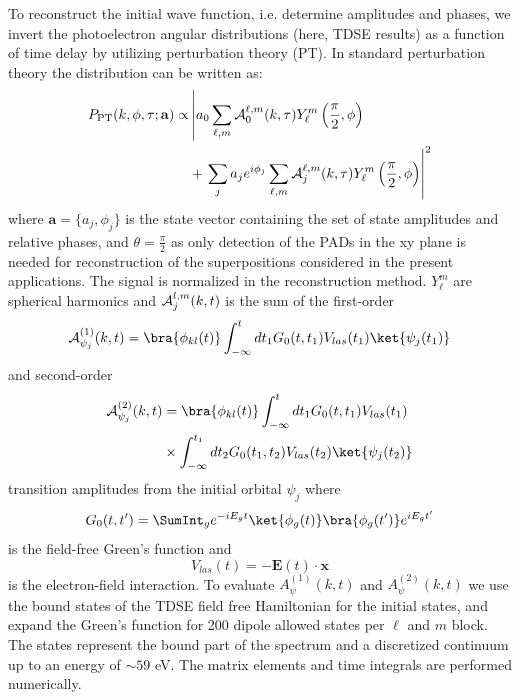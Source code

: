 To reconstruct the initial wave function, i.e. determine amplitudes and phases, we invert the photoelectron angular distributions (here, TDSE results) as a function of time delay by utilizing perturbation theory (PT). In standard perturbation theory the distribution can be written as:
%
\begin{align}
    P_{\text{PT}}(k,\phi,\tau; \mathbf{a}) \propto& \left|a_0 \sum_{\ell,m} {\cal A}_0^{\ell,m}(k,\tau) Y_\ell^m\left(\frac{\pi}{2},\phi\right) \right.
    \\ 
    & + \left. \sum_j a_j e^{i\phi_j} \sum_{\ell,m} {\cal A}_j^{\ell,m}(k,\tau) Y_\ell^m\left(\frac{\pi}{2},\phi\right)\right|^2
    \nonumber
\end{align}
%
where $\mathbf{a} = \{a_j,\phi_j\}$ is the state vector containing the set of state amplitudes and relative phases, and $\theta=\frac{\pi}{2}$ as only detection of the PADs in the xy plane is needed for reconstruction of the superpositions considered in the present applications. The signal is normalized in the reconstruction method. $Y_\ell^m$ are spherical harmonics
and ${\cal A}_j^{l,m}(k,t)$ is the sum of the first-order
%
\begin{equation}
    {\cal A}_{\psi_j}^{(1)}(k,t) = \bra{\phi_{kl}(t)}\int_{-\infty}^t dt_1 G_0(t,t_1)V_{las}(t_1)\ket{\psi_j(t_1)} 
\end{equation}
%
and second-order
%
\begin{align}
    {\cal A}_{\psi_j}^{(2)}(k,t) &= \bra{\phi_{kl}(t)}\int_{-\infty}^t dt_1 G_0(t,t_1)V_{las}(t_1) 
    \nonumber
    \\
    &\times \int_{-\infty}^{t_1} dt_2 G_0(t_1,t_2)V_{las}(t_2)\ket{\psi_j(t_2)}
\end{align}
%
transition amplitudes from the initial orbital $\psi_j$ where
%
\begin{equation}
    G_0(t,t') = \SumInt_g e^{-iE_g t}\ket{\phi_g(t)}\bra{\phi_g(t')} e^{iE_g t'}
\end{equation}
%
is the field-free Green's function and 
%
\begin{equation}
   V_{las}(t) = - \mathbf{E}(t) \cdot \mathbf{x} 
\end{equation}
%
is the electron-field interaction. To evaluate $A_\psi^{(1)}(k,t)$ and $A_\psi^{(2)}(k,t)$ we use the bound states of the TDSE field free Hamiltonian for the initial states, and expand the Green's function for 200 dipole allowed states per $\ell$ and $m$ block. The states represent the bound part of the spectrum and a discretized continuum up to an energy of $\sim59$ eV.
The matrix elements and time integrals are performed numerically.


